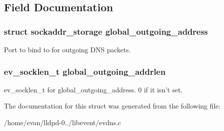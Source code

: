 \subsection{\-Field \-Documentation}
\subsubsection[{global\-\_\-outgoing\-\_\-address}]{\setlength{\rightskip}{0pt plus 5cm}struct {\bf sockaddr\-\_\-storage} {\bf global\-\_\-outgoing\-\_\-address}}\label{structevdns__base_a1d435110e3bac893c65293eabe67c191}
\-Port to bind to for outgoing \-D\-N\-S packets. 
\subsubsection[{global\-\_\-outgoing\-\_\-addrlen}]{\setlength{\rightskip}{0pt plus 5cm}ev\-\_\-socklen\-\_\-t {\bf global\-\_\-outgoing\-\_\-addrlen}}\label{structevdns__base_a905537424a35b71fc4d04c1db8871e78}
ev\-\_\-socklen\-\_\-t for global\-\_\-outgoing\-\_\-address. 0 if it isn't set. 

\-The documentation for this struct was generated from the following file\-:\begin{DoxyCompactItemize}
\item 
/home/evan/lldpd-\/0../libevent/evdns.\-c\end{DoxyCompactItemize}
